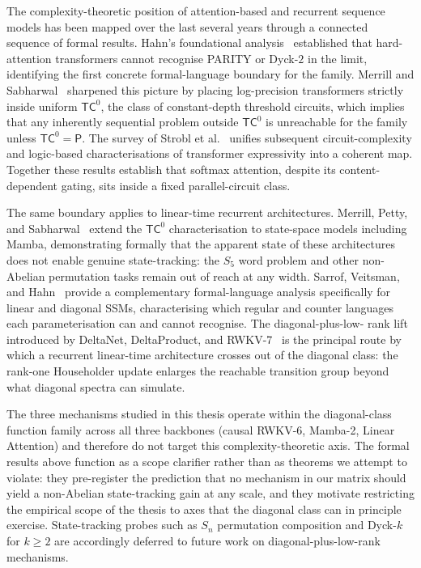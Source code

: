   The complexity-theoretic position of attention-based and
  recurrent sequence models has been mapped over the last several
  years through a connected sequence of formal results. Hahn's
  foundational analysis~\cite{hahn2020limitations} established that
  hard-attention transformers cannot recognise PARITY or Dyck-$2$
  in the limit, identifying the first concrete formal-language
  boundary for the family. Merrill and
  Sabharwal~\cite{merrill2023parallelism} sharpened this picture
  by placing log-precision transformers strictly inside uniform
  $\mathsf{TC}^0$, the class of constant-depth threshold circuits,
  which implies that any inherently sequential problem outside
  $\mathsf{TC}^0$ is unreachable for the family unless
  $\mathsf{TC}^0 = \mathsf{P}$. The survey of Strobl et
  al.~\cite{strobl2024formal} unifies subsequent circuit-complexity
  and logic-based characterisations of transformer expressivity
  into a coherent map. Together these results establish that
  softmax attention, despite its content-dependent gating, sits
  inside a fixed parallel-circuit class.

  The same boundary applies to linear-time recurrent
  architectures. Merrill, Petty, and
  Sabharwal~\cite{merrill2024illusion} extend the
  $\mathsf{TC}^0$ characterisation to state-space models including
  Mamba, demonstrating formally that the apparent state of these
  architectures does not enable genuine state-tracking: the
  $S_5$ word problem and other non-Abelian permutation tasks remain
  out of reach at any width. Sarrof, Veitsman, and
  Hahn~\cite{sarrof2024expressive} provide a complementary
  formal-language analysis specifically for linear and diagonal SSMs,
  characterising which regular and counter languages each
  parameterisation can and cannot recognise. The diagonal-plus-low-
  rank lift introduced by DeltaNet, DeltaProduct, and
  RWKV-7~\cite{schlag2021deltanet,yang2024deltanet,peng2025rwkv7} is
  the principal route by which a recurrent linear-time architecture
  crosses out of the diagonal class: the rank-one Householder
  update enlarges the reachable transition group beyond what diagonal
  spectra can simulate.

  The three mechanisms studied in this thesis operate within the
  diagonal-class function family across all three backbones (causal
  RWKV-6, Mamba-2, Linear Attention) and therefore do not target
  this complexity-theoretic axis. The formal results above function
  as a scope clarifier rather than as theorems we attempt to violate:
  they pre-register the prediction that no mechanism in our matrix
  should yield a non-Abelian state-tracking gain at any scale, and
  they motivate restricting the empirical scope of the thesis to
  axes that the diagonal class can in principle exercise.
  State-tracking probes such as $S_n$ permutation composition and
  Dyck-$k$ for $k \ge 2$ are accordingly deferred to future work
  on diagonal-plus-low-rank mechanisms.


